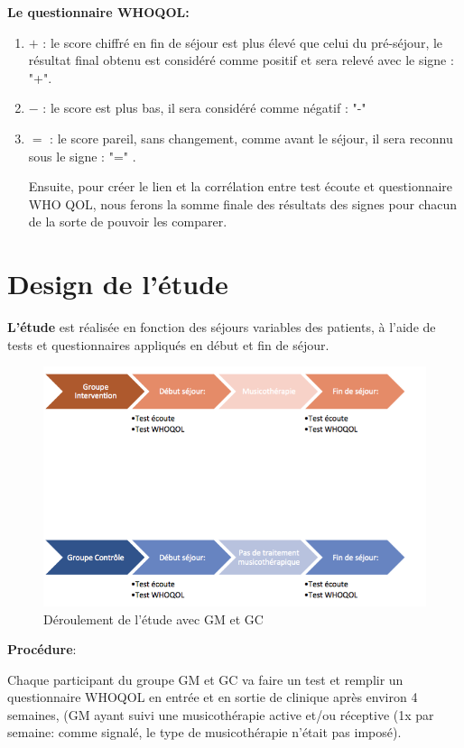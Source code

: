 \textbf{Le questionnaire WHOQOL:} 	
\begin{enumerate}
\item$+$  :  le score chiffré  en fin de séjour est plus élevé
que celui du
pré-séjour, le résultat final obtenu est considéré comme
positif et sera relevé  avec le signe : "+". 
\item $-$ : le score est plus bas, il  sera considéré comme négatif : "-"  
\item$=$ : le score pareil, sans changement,  comme avant le séjour, il sera reconnu sous le signe :  "=" .

Ensuite, pour créer le lien et la corrélation entre test écoute et questionnaire WHO QOL, nous ferons la 
somme finale des résultats des signes pour chacun de la sorte de pouvoir les comparer.
\end{enumerate}
 
\section{Design de l'étude}

\textbf{L'étude} est
réalisée en fonction des séjours variables des patients, à l'aide de tests et questionnaires appliqués en 
début
et fin de séjour.



\begin{figure}%
	\centering
	\includegraphics[width=1\linewidth]{images/Groupecontrole.png}
	\caption[Schéma du déroulement]{Déroulement de l'étude avec GM et GC}
	
\end{figure}
\textbf{Procédure}:


Chaque participant du groupe GM et GC va faire  un
test et remplir un questionnaire  WHOQOL en entrée et en sortie de
clinique  après environ 4 semaines, (GM ayant suivi une musicothérapie active et/ou réceptive (1x par
semaine:  comme signalé, le type de musicothérapie n'était pas imposé).

